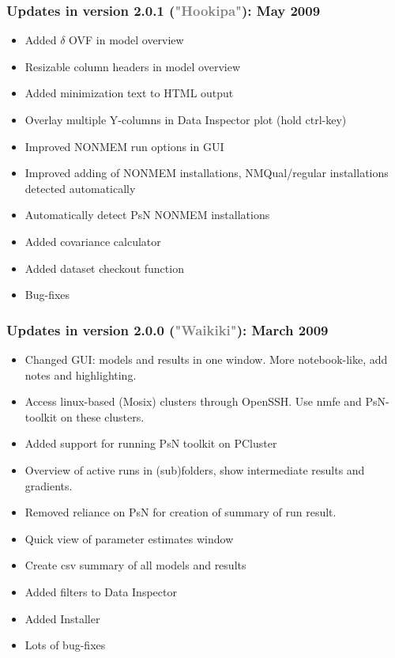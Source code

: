 \documentclass[a4,11pt]{report} \usepackage[pdftex]{graphicx}
\begin{document}
{{{{\subsubsection*{Updates in version 2.0.1
(\textcolor{Grey}{"Hookipa"}): May 2009}
\begin{itemize} \scriptsize
  \item Added $\delta$ OVF in model overview
  \item Resizable column headers in model overview
  \item Added minimization text to HTML output
  \item Overlay multiple Y-columns in Data Inspector plot (hold
ctrl-key)
  \item Improved NONMEM run options in GUI
  \item Improved adding of NONMEM installations, NMQual/regular
installations detected automatically
  \item Automatically detect PsN NONMEM installations
  \item Added covariance calculator
  \item Added dataset checkout function
  \item Bug-fixes
\end{itemize}
\subsubsection*{Updates in version 2.0.0
(\textcolor{Grey}{"Waikiki"}): March 2009}
\begin{itemize} \scriptsize
  \item Changed GUI: models and results in one window. More
notebook-like, add notes and highlighting.
  \item Access linux-based (Mosix) clusters through OpenSSH. Use nmfe
and PsN-toolkit on these clusters.
  \item Added support for running PsN toolkit on PCluster
  \item Overview of active runs in (sub)folders, show intermediate
results and gradients.
  \item Removed reliance on PsN for creation of summary of run result.
  \item Quick view of parameter estimates window
  \item Create csv summary of all models and results
  \item Added filters to Data Inspector
  \item Added Installer
  \item Lots of bug-fixes
\end{itemize}
}}}}
\end{document}
